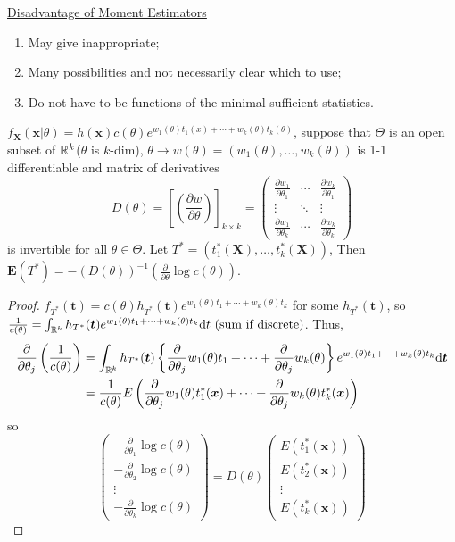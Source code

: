 \documentclass[english, 11pt]{article}
\begin{document}
\underline{Disadvantage of Moment Estimators}
\begin{enumerate}[1)]
\item May give inappropriate;
\item Many possibilities and not necessarily clear which to use;
\item Do not have to be functions of the minimal sufficient statistics.
\end{enumerate}


\begin{thrm}\label{thrm:38}
$f_{\bm{X}}(\bm{x}|\theta)=h(\bm{x})c(\theta)e^{w_1(\theta)t_1(x)+\cdots+w_k(\theta)t_k(\theta)}$, suppose that $\Theta$ is an open subset of ${\mathbb{R}}^k$($\theta$ is $k$-dim), $\theta\rightarrow w(\theta)=(w_1(\theta), \dots, w_k(\theta))$ is 1-1 differentiable and matrix of derivatives
$$
D(\theta)=\left[\left(\frac{\partial w}{\partial \theta}\right)\right]_{k\times k}=\left(\begin{matrix}
\frac{\partial w_1}{\partial \theta_1} &\cdots &\frac{\partial w_k}{\partial \theta_1}\\
\vdots &\ddots &\vdots\\
\frac{\partial w_1}{\partial \theta_k} &\cdots &\frac{\partial w_k}{\partial \theta_k}
\end{matrix}\right)
$$
is invertible for all $\theta\in\Theta$. Let $T^*=(t_1^*(\bm{X}), \dots, t_k^*(\bm{X}))$, Then $\bm{E}(T^*)=-(D(\theta))^{-1}\left(\frac{\partial}{\partial \theta}\log c(\theta)\right)$.
\end{thrm}

\begin{proof}
$f_{T^*}(\bm{t})=c(\theta)h_{T^*}(\bm{t})e^{w_1(\theta)t_1+\cdots+w_k(\theta)t_k}$ for some $h_{T^*}(\bm{t})$, so $\frac{1}{c(\theta)}=\int_{{\mathbb{R}}^k} h_{T^*}(\bm{t})e^{w_1(\theta)t_1+\cdots+w_k(\theta)t_k}\mathrm{d}t \text{ (sum if discrete)}$. Thus, 
$$
\begin{aligned}
\frac{\partial}{\partial \theta_j}\left(\frac{1}{c(\theta)}\right)&=\int_{{\mathbb{R}}^k}h_{T^*}(\bm{t})\left\{\frac{\partial}{\partial \theta_j}w_1(\theta)t_1+\cdots+\frac{\partial}{\partial \theta_j}w_k(\theta)\right\}e^{w_1(\theta)t_1+\cdots+w_k(\theta)t_k}\mathrm{d}\bm{t}\\
&=\frac{1}{c(\theta)}E\left(\frac{\partial}{\partial \theta_j}w_1(\theta)t_1^*(\bm{x})+\cdots+\frac{\partial}{\partial \theta_j}w_k(\theta)t_k^*(\bm{x})\right)
\end{aligned}
$$
so
$$
\left(\begin{matrix}
-\frac{\partial}{\partial \theta_1}\log c(\theta)\\
-\frac{\partial}{\partial \theta_2}\log c(\theta)\\
\vdots\\
-\frac{\partial}{\partial \theta_k}\log c(\theta)
\end{matrix}\right)=D(\theta)\left(\begin{matrix}
E(t_1^*(\bm{x}))\\
E(t_2^*(\bm{x}))\\
\vdots\\
E(t_k^*(\bm{x}))
\end{matrix}\right)
$$
\end{proof}
\end{document}
